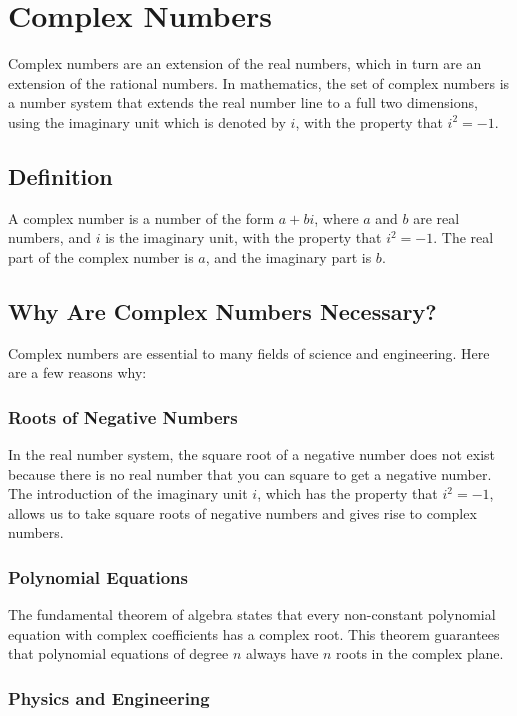 \chapter{Complex Numbers}

Complex numbers are an extension of the real numbers, which in turn are an extension of the rational numbers. In mathematics, the set of complex numbers is a number system that extends the real number line to a full two dimensions, using the imaginary unit which is denoted by $i$, with the property that $i^2 = -1$.

\section{Definition}

A complex number is a number of the form $a + bi$, where $a$ and $b$ are real numbers, and $i$ is the imaginary unit, with the property that $i^2 = -1$. The real part of the complex number is $a$, and the imaginary part is $b$. 

\section{Why Are Complex Numbers Necessary?}

Complex numbers are essential to many fields of science and engineering. Here are a few reasons why:

\subsection{Roots of Negative Numbers}

In the real number system, the square root of a negative number does not exist because there is no real number that you can square to get a negative number. The introduction of the imaginary unit $i$, which has the property that $i^2 = -1$, allows us to take square roots of negative numbers and gives rise to complex numbers.

\subsection{Polynomial Equations}

The fundamental theorem of algebra states that every non-constant polynomial equation with complex coefficients has a complex root. This theorem guarantees that polynomial equations of degree $n$ always have $n$ roots in the complex plane.

\subsection{Physics and Engineering}

